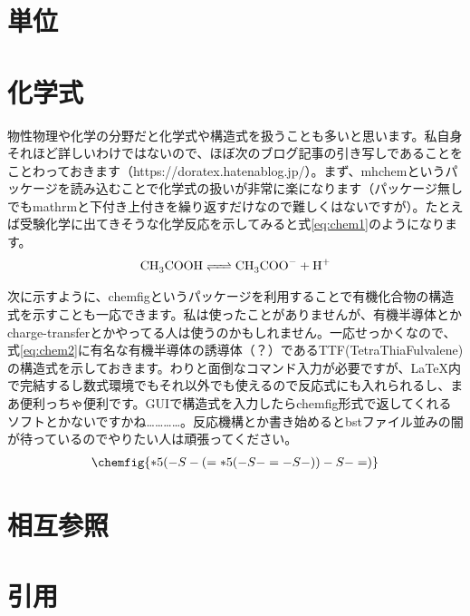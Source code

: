 \section{単位}
\section{化学式}
物性物理や化学の分野だと化学式や構造式を扱うことも多いと思います。私自身それほど詳しいわけではないので、ほぼ次のブログ記事の引き写しであることをことわっておきます（https://doratex.hatenablog.jp/）。まず、mhchemというパッケージを読み込むことで化学式の扱いが非常に楽になります（パッケージ無しでもmathrmと下付き上付きを繰り返すだけなので難しくはないですが）。たとえば受験化学に出てきそうな化学反応を示してみると式\ref{eq:chem1}のようになります。
\begin{align}\label{eq:chem1}
\ce{CH3COOH <=> CH3COO- + H+}
\end{align}%

次に示すように、chemfigというパッケージを利用することで有機化合物の構造式を示すことも一応できます。私は使ったことがありませんが、有機半導体とかcharge-transferとかやってる人は使うのかもしれません。一応せっかくなので、式\ref{eq:chem2}に有名な有機半導体の誘導体（？）であるTTF(TetraThiaFulvalene)の構造式を示しておきます。わりと面倒なコマンド入力が必要ですが、\LaTeX 内で完結するし数式環境でもそれ以外でも使えるので反応式にも入れられるし、まあ便利っちゃ便利です。GUIで構造式を入力したらchemfig形式で返してくれるソフトとかないですかね…………。反応機構とか書き始めるとbstファイル並みの闇が待っているのでやりたい人は頑張ってください。
\begin{align}\label{eq:chem2}
\chemfig{
*5(-S-(=*5(-S-=-S-))-S-=)
}
\end{align}%
\section{相互参照}
\section{引用}